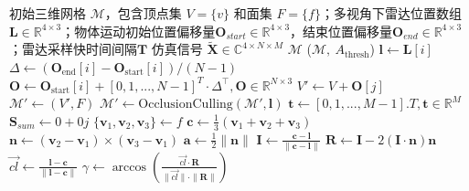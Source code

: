 \begin{algorithm}[H]
\caption{雷达信号仿真算法}
\label{algo:simulate}
\begin{algorithmic}[1]
    \Require
    \Statex 初始三维网格 $\mathcal{M}$，包含顶点集 $V = \{v\}$ 和面集 $F = \{f\}$；多视角下雷达位置数组 $\mathbf{L} \in \mathbb{R}^{4\times 3}$；物体运动初始位置偏移量$\mathbf{O}_{start}\in \mathbb{R}^{4\times 3} $，结束位置偏移量$\mathbf{O}_{end}\in \mathbb{R}^{4\times 3}$；雷达采样快时间间隔$\mathbf{T}$
    \Ensure 仿真信号 $\tilde{\mathbf{X}} \in \mathbb{C}^{4 \times N \times M}$ 
    \State $\mathcal{M}$ \gets {}($\mathcal{M},\ A_{\text{thresh}}$) 
        \State $\mathbf{l} \gets \mathbf{L}[i]$ 
        \State $\Delta \gets (\mathbf{O}_{\text{end}}[i] - \mathbf{O}_{\text{start}}[i])/(N-1)$
        \State $\mathbf{O} \gets \mathbf{O}_{\text{start}}[i] + [0,1,...,N-1]^T \cdot \Delta^\top,\mathbf{O}\in \mathbb{R}^{N\times 3}$  
               
            \State $V' \gets V+\mathbf{O}[j]$ 
            \State $\mathcal{M}' \gets (V',F)$
            \State $\mathcal{M}' \gets \text{OcclusionCulling}(\mathcal{M}',\mathbf{l})$    
            \State $\mathbf{t} \gets [0,1,...,M-1].T,\mathbf{t}\in\mathbb{R}^{M}$ 
             
                \State $\mathbf{S}_{sum} \gets 0+0j$
                 
                    \State$\{\mathbf{v}_1,\mathbf{v}_2,\mathbf{v}_3\}\gets f$
                    \State$\mathbf{c} \gets \frac{1}{3}(\mathbf{v}_1+\mathbf{v}_2+\mathbf{v}_3)$ 
                    \State $ \mathbf{n} \gets (\mathbf{v}_{2} - \mathbf{v}_{1}) \times (\mathbf{v}_{3} - \mathbf{v}_{1})$           
                    \State $\mathbf{a} \gets \frac{1}{2}\|\mathbf{n}\|$      
                    \State $\mathbf{I} \gets \frac{\mathbf{c}-\mathbf{l}}{\|\mathbf{c}-\mathbf{l}\|}$ 
                    \State $\mathbf{R} \gets \mathbf{I}-2(\mathbf{I}\cdot \mathbf{n})\mathbf{n}$    
                    \State $\overrightarrow{cl} \gets \frac{\mathbf{l}-\mathbf{c}}{\|\mathbf{l}-\mathbf{c}\|}$ 
                    \State $\gamma \gets \arccos\left(\frac{\overrightarrow{cl}\cdot\mathbf{R}}{\|\overrightarrow{cl}\|\cdot\|\mathbf{R}\|}\right)$   

\end{algorithmic}
\end{algorithm}
